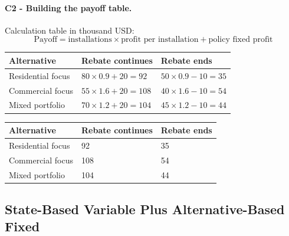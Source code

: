 
	\paragraph*{C2 - Building the payoff table.}
	\label{subsec:problem19-solar-installation-bids-c2}
	Calculation table in thousand USD:
	\[
	\text{Payoff}=\text{installations}\times\text{profit per installation}+\text{policy fixed profit}
	\]
	\begin{center}
		\begin{tabular}{lll}
			\toprule
			Alternative & Rebate continues & Rebate ends \\
			\midrule
			Residential focus & $80 \times 0.9 + 20 = 92$ & $50 \times 0.9 - 10 = 35$ \\
			Commercial focus & $55 \times 1.6 + 20 = 108$ & $40 \times 1.6 - 10 = 54$ \\
			Mixed portfolio & $70 \times 1.2 + 20 = 104$ & $45 \times 1.2 - 10 = 44$ \\
			\bottomrule
		\end{tabular}
	\end{center}

	\begin{center}
		\begin{tabular}{lll}
			\toprule
			Alternative & Rebate continues & Rebate ends \\
			\midrule
			Residential focus & 92 & 35 \\
			Commercial focus & 108 & 54 \\
			Mixed portfolio & 104 & 44 \\
			\bottomrule
		\end{tabular}
	\end{center}


	\subsection{State-Based Variable Plus Alternative-Based Fixed}
	\label{sec:state-based-variable-payoff-plus-alternative-based-fixed-payoff}


